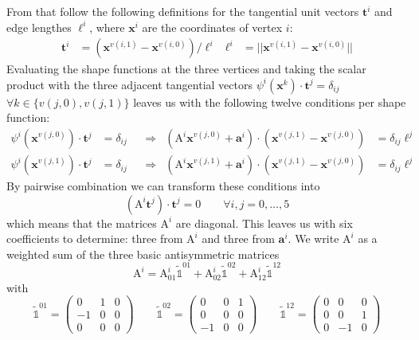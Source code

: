 \documentclass{scrartcl}
\begin{document}
From that follow the following definitions for the tangential unit vectors
$\mathbf t^i$ and edge lengthes $\ell^i$, where $\mathbf x^i$ are the
coordinates of vertex $i$:
\begin{subequations}
  \begin{align}
    \mathbf t^i&=(\mathbf x^{v(i,1)}-\mathbf x^{v(i,0)})/\ell^i &
         \ell^i&=||\mathbf x^{v(i,1)}-\mathbf x^{v(i,0)}||
  \end{align}
\end{subequations}
Evaluating the shape functions at the three vertices and taking the scalar
product with the three adjacent tangential vectors $\psi^i(\mathbf
x^k)\cdot\mathbf t^j=\delta_{ij}$ $\forall k\in\{v(j,0),v(j,1)\}$ leaves us with
the following twelve conditions per shape function:
\begin{subequations}
  \begin{align}
    \label{cond:x0t0}
    \psi^i(\mathbf x^{v(j,0)})\cdot\mathbf t^j&=\delta_{ij} &&\Longrightarrow &
        (\mathrm A^i\mathbf x^{v(j,0)}+\mathbf a^i)
        \cdot(\mathbf x^{v(j,1)}-\mathbf x^{v(j,0)})&=\delta_{ij}\ell^j              \\
    \label{cond:x1t0}
    \psi^i(\mathbf x^{v(j,1)})\cdot\mathbf t^j&=\delta_{ij} &&\Longrightarrow &
        (\mathrm A^i\mathbf x^{v(j,1)}+\mathbf a^i)
        \cdot(\mathbf x^{v(j,1)}-\mathbf x^{v(j,0)})&=\delta_{ij}\ell^j
  \end{align}
\end{subequations}
By pairwise combination we can transform these conditions into
\begin{equation}
  (\mathrm A^i\mathbf t^j)\cdot\mathbf t^j=0
        \qquad\forall i,j=0,\ldots,5
\end{equation}
which means that the matrices $\mathrm A^i$ are diagonal.  This leaves us with
six coefficients to determine: three from $\mathrm A^i$ and three from
$\mathbf a^i$.  We write $\mathrm A^i$ as a weighted sum of the three basic
antisymmetric matrices
\begin{equation}
  \mathrm A^i=\mathrm A^i_{01}\mathds{\tilde1}^{01}
  +\mathrm A^i_{02}\mathds{\tilde1}^{02}
  +\mathrm A^i_{12}\mathds{\tilde1}^{12}
\end{equation}
with
\begin{equation}
  \mathds{\tilde1}^{01}=\begin{pmatrix}
     0 &  1 &  0 \\
    -1 &  0 &  0 \\
     0 &  0 &  0
  \end{pmatrix}
  \qquad
  \mathds{\tilde1}^{02}=\begin{pmatrix}
     0 &  0 &  1 \\
     0 &  0 &  0 \\
    -1 &  0 &  0
  \end{pmatrix}
  \qquad
  \mathds{\tilde1}^{12}=\begin{pmatrix}
     0 &  0 &  0 \\
     0 &  0 &  1 \\
     0 & -1 &  0
  \end{pmatrix}
\end{equation}
\end{document}
